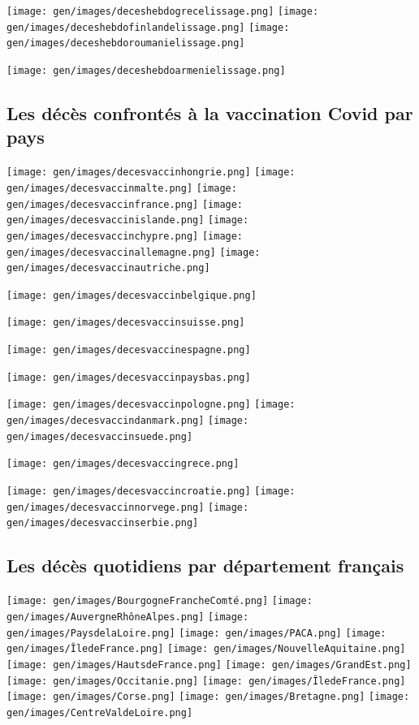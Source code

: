 \documentclass[
]{article}
\begin{document}
\texttt{[image: gen/images/deceshebdogrecelissage.png]}
\texttt{[image: gen/images/deceshebdofinlandelissage.png]}
\texttt{[image: gen/images/deceshebdoroumanielissage.png]}

\texttt{[image: gen/images/deceshebdoarmenielissage.png]}

\hypertarget{les-duxe9cuxe8s-confrontuxe9s-uxe0-la-vaccination-covid-par-pays}{%
\subsection{Les décès confrontés à la vaccination Covid par
pays}\label{les-duxe9cuxe8s-confrontuxe9s-uxe0-la-vaccination-covid-par-pays}}

\texttt{[image: gen/images/decesvaccinhongrie.png]}
\texttt{[image: gen/images/decesvaccinmalte.png]}
\texttt{[image: gen/images/decesvaccinfrance.png]}
\texttt{[image: gen/images/decesvaccinislande.png]}
\texttt{[image: gen/images/decesvaccinchypre.png]}
\texttt{[image: gen/images/decesvaccinallemagne.png]}
\texttt{[image: gen/images/decesvaccinautriche.png]}

\texttt{[image: gen/images/decesvaccinbelgique.png]}

\texttt{[image: gen/images/decesvaccinsuisse.png]}

\texttt{[image: gen/images/decesvaccinespagne.png]}

\texttt{[image: gen/images/decesvaccinpaysbas.png]}

\texttt{[image: gen/images/decesvaccinpologne.png]}
\texttt{[image: gen/images/decesvaccindanmark.png]}
\texttt{[image: gen/images/decesvaccinsuede.png]}

\texttt{[image: gen/images/decesvaccingrece.png]}

\texttt{[image: gen/images/decesvaccincroatie.png]}
\texttt{[image: gen/images/decesvaccinnorvege.png]}
\texttt{[image: gen/images/decesvaccinserbie.png]}

\hypertarget{les-duxe9cuxe8s-quotidiens-par-duxe9partement-franuxe7ais}{%
\subsection{Les décès quotidiens par département
français}\label{les-duxe9cuxe8s-quotidiens-par-duxe9partement-franuxe7ais}}

\texttt{[image: gen/images/BourgogneFrancheComté.png]}
\texttt{[image: gen/images/AuvergneRhôneAlpes.png]}
\texttt{[image: gen/images/PaysdelaLoire.png]}
\texttt{[image: gen/images/PACA.png]}
\texttt{[image: gen/images/ÎledeFrance.png]}
\texttt{[image: gen/images/NouvelleAquitaine.png]}
\texttt{[image: gen/images/HautsdeFrance.png]}
\texttt{[image: gen/images/GrandEst.png]}
\texttt{[image: gen/images/Occitanie.png]}
\texttt{[image: gen/images/ÎledeFrance.png]}
\texttt{[image: gen/images/Corse.png]}
\texttt{[image: gen/images/Bretagne.png]}
\texttt{[image: gen/images/CentreValdeLoire.png]}
\end{document}
